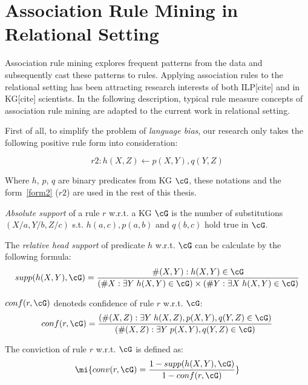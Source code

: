\section{Association Rule Mining in Relational Setting}

Association rule mining explores frequent patterns from the data and subsequently cast these patterns to rules. Applying association rules to the relational setting has been attracting research interests of both ILP[cite] and in KG[cite] scientists. In the following description, typical rule measure concepts of association rule mining are adapted to the current work in relational setting.

First of all, to simplify the problem of \textit{language bias}, our research only takes the following positive rule form into consideration:

\begin{equation}
r2: h(X, Z) \leftarrow p(X, Y), q(Y, Z)
\label{form2}
\end{equation}

Where $h$, $p$, $q$ are binary predicates from KG $\cG$, these notations and the form~\ref{form2} ($r2$) are used in the rest of this thesis.

\begin{definition}
\textit{Absolute support} of a rule $r$ w.r.t. a KG $\cG$ is the number of substitutions $(X/a, Y/b, Z/c)$ s.t. $h(a, c), p(a, b)$ and $q(b, c)$ hold true in $\cG$.
\end{definition}

\begin{definition}
The \textit{relative head support} of predicate $h$ w.r.t. $\cG$ can be calculate by the following formula:
\begin{equation}
supp(h(X,Y),\cG)=\dfrac{\#(X,Y):h(X,Y)\in \cG}{(\#X:\exists Y\;h(X,Y)\in \cG)\times(\#Y:\exists X\;h(X,Y)\in \cG)}
\end{equation}
\end{definition}

\begin{definition}
$conf(r,\cG)$ denoteds confidence of rule $r$ w.r.t. $\cG$:
\begin{equation}
conf(r,\cG)=\dfrac{(\#(X, Z):\exists Y\;h(X,Z),p(X,Y),q(Y,Z)\in \cG)}{(\#(X,Z):\exists Y\;p(X,Y),q(Y,Z)\in \cG)}
\end{equation}
\end{definition}

\begin{definition}
The conviction of rule $r$ w.r.t. $\cG$ is defined as:
\begin{equation}
\mi{conv(r, \cG)= \dfrac{1 - supp(h(X,Y), \cG)}{1 - conf(r, \cG)}}
\end{equation}
\end{definition}

